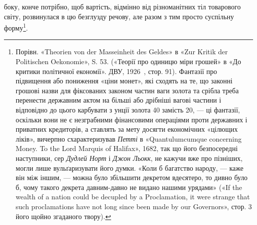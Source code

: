 \parcont{}  %
боку, конче потрібно, щоб вартість, відмінно від різноманітних
тіл товарового світу, розвинулася в цю безглузду речову, але
разом з тим просто суспільну форму\footnote{
Порівн. «Theorien von der Masseinheit des Geldes» в «Zur Kritik
der Politischen Oekonomie», S. 53. («Теорії про одиницю міри грошей»
в «До критики політичної економії». ДВУ, 1926~, стор. 91). Фантазії
про підвищення або пониження «ціни монет», які сходять на те, що законні
грошові назви для фіксованих законом частин ваги золота та срібла
треба перенести державним актом на більші або дрібніші вагові частини
і відповідно до цього карбувати з  унції золота 40 замість 20, —
ці фантазії, оскільки вони не є незграбними фінансовими операціями проти
державних і приватних кредиторів, а ставлять за мету досягти економічних
«цілющих ліків», вичерпно схарактеризував \emph{Петті} в «Quantulumcumque
concerning Money. To the Lord Marquis of Halifax», 1682, так
що його безпосередні наступники, сер \emph{Дудлей Норт} і \emph{Джон Льокк},
не кажучи вже про пізніших, могли лише вульґаризувати його
думки. «Коли б багатство народу, — каже він між іншим, — можна
було збільшити декретом вдесятеро, то дивно було б, чому такого декрета
давним-давно не видано нашими урядами» («If the wealth of a nation
could be decupled by a Proclamation, it were strange that such proclamations
have not long since been made by our Governors», стор. 3 його щойно згаданого
твору).
}.

